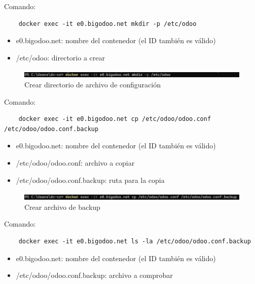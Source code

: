 \documentclass[a4paper,12pt]{article}
\begin{document}
Comando: 
\begin{verbatim}
    docker exec -it e0.bigodoo.net mkdir -p /etc/odoo
\end{verbatim}

\begin{itemize}
    \item e0.bigodoo.net: nombre del contenedor (el ID también es válido)
    \item /etc/odoo: directorio a crear
\end{itemize}

\begin{figure}[h!]
    \centering
    \includegraphics[width=1\textwidth]{pr2odoo82-crearDirectorio.png}
    \caption{Crear directorio de archivo de configuración}
\end{figure}
\FloatBarrier

Comando: 
\begin{verbatim}
    docker exec -it e0.bigodoo.net cp /etc/odoo/odoo.conf /etc/odoo/odoo.conf.backup
\end{verbatim}

\begin{itemize}
    \item e0.bigodoo.net: nombre del contenedor (el ID también es válido)
    \item /etc/odoo/odoo.conf: archivo a copiar
    \item /etc/odoo/odoo.conf.backup: ruta para la copia
\end{itemize}

\begin{figure}[h!]
    \centering
    \includegraphics[width=1\textwidth]{pr2odoo83-crearBackup.png}
    \caption{Crear archivo de backup}
\end{figure}
\FloatBarrier

Comando: 
\begin{verbatim}
    docker exec -it e0.bigodoo.net ls -la /etc/odoo/odoo.conf.backup
\end{verbatim}

\begin{itemize}
    \item e0.bigodoo.net: nombre del contenedor (el ID también es válido)
    \item /etc/odoo/odoo.conf.backup: archivo a comprobar
\end{itemize}
\end{document}
